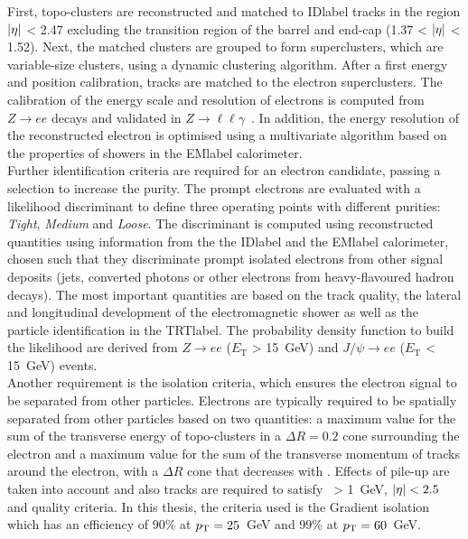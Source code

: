 First, topo-clusters are reconstructed and matched to \acrshort{IDlabel} tracks in the region $\abs{\eta}$ < 2.47 excluding the transition region of the barrel and end-cap (1.37 < $\abs{\eta}$ < 1.52). Next, the matched clusters are grouped to form superclusters, which are variable-size clusters, using a dynamic clustering algorithm. After a first energy and position calibration, tracks are matched to the electron superclusters. The calibration of the energy scale and resolution of electrons is computed from $Z\rightarrow ee$ decays and validated in $Z\rightarrow \ell\ell\gamma$~\cite{performanceEgamma}. In addition, the energy resolution of the reconstructed electron is optimised using a multivariate algorithm based on the properties of showers in the \acrshort{EMlabel} calorimeter.\\

Further identification criteria are required for an electron candidate, passing a selection to increase the purity. The prompt electrons are evaluated with a likelihood discriminant to define three operating points with different purities: \textit{Tight}, \textit{Medium} and \textit{Loose}. The discriminant is computed using reconstructed quantities using information from the the \acrshort{IDlabel} and the \acrshort{EMlabel} calorimeter, chosen such that they discriminate prompt isolated electrons from other signal deposits (jets, converted photons or other electrons from heavy-flavoured hadron decays). The most important quantities are based on the track quality, the lateral and longitudinal development of the electromagnetic shower as well as the particle identification in the \acrshort{TRTlabel}. The probability density function to build the likelihood are derived from $Z\rightarrow ee$ ($E_\text{T}$ > 15~GeV) and $J/\psi \rightarrow ee$ ($E_\text{T}$ < 15~GeV) events.\\

Another requirement is the isolation criteria, which ensures the electron signal to be separated from other particles. Electrons are typically required to be spatially separated from other particles based on two quantities: a maximum value for the sum of the transverse energy of topo-clusters in a $\Delta R=0.2$ cone surrounding the electron and a maximum value for the sum of the transverse momentum of tracks around the electron, with a $\Delta R$ cone that decreases with \pT. Effects of pile-up are taken into account and also tracks are required to satisfy \pT\ > 1~GeV, $\abs{\eta}<2.5$ and quality criteria. In this thesis, the criteria used is the Gradient isolation which has an efficiency of 90\% at $p_{\text{T}} = 25$~GeV and 99\% at $p_{\text{T}} = 60$~GeV.

